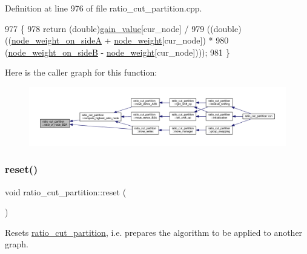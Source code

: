 Definition at line 976 of file ratio\+\_\+cut\+\_\+partition.\+cpp.


\begin{DoxyCode}
977 \{
978     \textcolor{keywordflow}{return} (\textcolor{keywordtype}{double})\mbox{\hyperlink{classratio__cut__partition_af24ff191abbb0578f0bfc54fef5f6d45}{gain\_value}}[cur\_node] /
979     ((double)((\mbox{\hyperlink{classratio__cut__partition_af1b839e48e498cf8ca93c8ec5df8a686}{node\_weight\_on\_sideA}} + \mbox{\hyperlink{classratio__cut__partition_a4d9d2a9317a062f839ea7155c37b173f}{node\_weight}}[cur\_node]) *
980         (\mbox{\hyperlink{classratio__cut__partition_aa16d1b508db86eb0ba4824642394999a}{node\_weight\_on\_sideB}} - \mbox{\hyperlink{classratio__cut__partition_a4d9d2a9317a062f839ea7155c37b173f}{node\_weight}}[cur\_node])));
981 \}
\end{DoxyCode}
Here is the caller graph for this function\+:\nopagebreak
\begin{figure}[H]
\begin{center}
\leavevmode
\includegraphics[width=350pt]{classratio__cut__partition_a094de379f453978db56695d53f6bc536_icgraph}
\end{center}
\end{figure}
\mbox{\label{classratio__cut__partition_ad017eaf98f9ae4ca9dbe6b3eda9fc94d}} 
\subsubsection{\texorpdfstring{reset()}{reset()}}
{\footnotesize\ttfamily void ratio\+\_\+cut\+\_\+partition\+::reset (\begin{DoxyParamCaption}{ }\end{DoxyParamCaption})\hspace{0.3cm}{\ttfamily [virtual]}}

Resets \mbox{\hyperlink{classratio__cut__partition}{ratio\+\_\+cut\+\_\+partition}}, i.\+e. prepares the algorithm to be applied to another graph.

